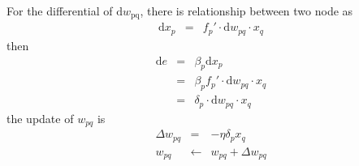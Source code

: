 \documentclass{article}
\newcommand{\mathd}{\mathrm{d}}
\newcommand{\tmop}[1]{\ensuremath{\operatorname{#1}}}
\begin{document}
For the differential of $\mathd w_{\tmop{pq}}$, there is relationship between
two node as
\begin{eqnarray*}
  \mathd x_p & = & f_p' \cdot \mathd w_{p q} \cdot x_q
\end{eqnarray*}
then
\begin{eqnarray*}
  \mathd e & = & \beta_p \mathd x_p\\
  & = & \beta_p f_p' \cdot \mathd w_{p q} \cdot x_q\\
  & = & \delta_p \cdot \mathd w_{p q} \cdot x_q
\end{eqnarray*}
the update of $w_{p q}$ is
\begin{eqnarray*}
  \Delta w_{p q} & = & - \eta \delta_p x_q\\
  w_{p q} & \leftarrow & w_{p q} + \Delta w_{p q}
\end{eqnarray*}


\
\end{document}
